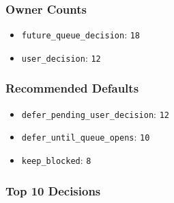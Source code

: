 \documentclass[9pt,a4paper,openany]{book}
\begin{document}
\subsubsection{Owner Counts}

\begin{itemize}
\item \texttt{future\_\allowbreak{}queue\_\allowbreak{}decision}: \texttt{18}
\item \texttt{user\_\allowbreak{}decision}: \texttt{12}
\end{itemize}

\subsubsection{Recommended Defaults}

\begin{itemize}
\item \texttt{defer\_\allowbreak{}pending\_\allowbreak{}user\_\allowbreak{}decision}: \texttt{12}
\item \texttt{defer\_\allowbreak{}until\_\allowbreak{}queue\_\allowbreak{}opens}: \texttt{10}
\item \texttt{keep\_\allowbreak{}blocked}: \texttt{8}
\end{itemize}

\subsubsection{Top 10 Decisions}
\end{document}
